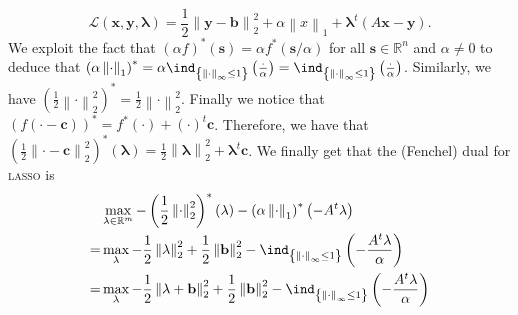 \documentclass{article}
\begin{document}
\begin{itemize}
\begin{equation*}
               \mathcal{L}\left(\mathbf{x}, \mathbf{y}, \mathbf{\lambda}\right) = 
               \frac{1}{2}\left\|\mathbf{y} - \mathbf{b}\right\|_{2}^{2} + 
               \alpha \left\|x\right\|_{1} +
               \mathbf{\lambda}^{t}\left(A\mathbf{x} - \mathbf{y}\right).
           \end{equation*}
           We exploit the fact that $\left(\alpha f\right)^{*}\left(\mathbf{s}\right)=
           \alpha f^{*}\left(\mathbf{s}/\alpha\right)$ 
           for all $\mathbf{s} \in \mathbb{R}^{n}$ and
           $\alpha \neq 0$ to deduce that
           $\left(\alpha\left\|\cdot\right\|_{1}\right)^{*} =
           \alpha \ind_{\left\{\left\|\cdot\right\|_{\infty} \leq 1\right\}}
           \left(\frac{\cdot}{\alpha}\right)=
           \ind_{\left\{\left\|\cdot\right\|_{\infty} \leq 1\right\}}
           \left(\frac{\cdot}{\alpha}\right)$.
           Similarly, we have
           $\left(\frac{1}{2}\left\|\cdot\right\|_{2}^{2}\right)^{*} = 
           \frac{1}{2}\left\|\cdot\right\|_{2}^{2}$.
           Finally we notice that
           $\left(f\left(\cdot - \mathbf{c}\right)\right)^{*} = 
           f^{*}\left(\cdot\right) + \left(\cdot\right)^{t}\mathbf{c}$.
           Therefore, we have that
           $\left(\frac{1}{2} \left\|\cdot - \mathbf{c}\right\|_{2}^{2}\right)^{*}
           \left(\mathbf{\lambda}\right)= 
           \frac{1}{2} \left\|\mathbf{\lambda}\right\|_{2}^{2}
           + \mathbf{\lambda}^{t}\mathbf{c}$.
           We finally get that the (Fenchel)
           dual for \textsc{lasso} is
           \begin{align*}
               & \max_{\mathbf{\lambda} \in \mathbb{R}^{m}}
               -\left(\frac{1}{2}\left\|\cdot\right\|_{2}^{2}\right)^{*}\left(\mathbf{\lambda}\right)
               -\left(\alpha\left\|\cdot\right\|_{1}\right)^{*}
               \left(-A^{t}\mathbf{\lambda}\right)\\
               = &\max_{\mathbf{\lambda}} -\frac{1}{2}
               \left\|\mathbf{\lambda}\right\|_{2}^{2}
               +\frac{1}{2}\left\|\mathbf{b}\right\|_{2}^{2}
               - \ind_{\left\{\left\|\cdot\right\|_{\infty} \leq 1\right\}}
               \left(-\frac{A^{t}\mathbf{\lambda}}{\alpha}\right)\\
               =& \max_{\mathbf{\lambda}} -\frac{1}{2}\left\|\mathbf{\lambda} + \mathbf{b}\right\|_{2}^{2}
               +\frac{1}{2}\left\|\mathbf{b}\right\|^{2}_{2}
               -\ind_{\left\{\left\|\cdot\right\|_{\infty} \leq 1\right\}}
               \left(-\frac{A^{t}\mathbf{\lambda}}{\alpha}\right)\\

\end{align*}
\end{itemize}
\end{document}
